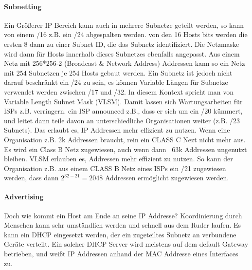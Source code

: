             \paragraph{Subnetting}
                Ein Größerer IP Bereich kann auch in mehrere Subnetze geteilt werden, so kann von einem /16 z.B. ein /24 abgespalten werden. von den 16 Hosts bits werden die ersten 8 dann zu einer Subnet ID, die das Subnetz identifiziert. Die Netzmaske wird dann für Hosts innerhalb dieses Subnetzes ebenfalls angepasst. Aus einem Netz mit 256*256-2 (Broadcast \& Network Address) Addressen kann so ein Netz mit 254 Subnetzen je 254 Hosts gebaut werden. Ein Subnetz ist jedoch nicht darauf beschränkt ein /24 zu sein, es können Variable Längen für Subnetze verwendet werden zwischen /17 und /32. In diesem Kontext spricht man von Variable Length Subnet Mask (VLSM). Damit lassen sich Wartungsarbeiten für ISPs z.B. verringern. ein ISP announced z.B., dass er sich um ein /20 kümmert, und leitet dann teile davon an unterschiedliche Organisationen weiter (z.B. /23 Subnets). Das erlaubt es, IP Addressen mehr effizient zu nutzen. Wenn eine Organisation z.B. 2k Addressen braucht, rein ein CLASS C Nezt nicht mehr aus. Es wird ein Class B Netz zugewiesen, auch wenn dann ~63k Addressen ungenutzt bleiben. VLSM erlauben es, Addressen mehr effizient zu nutzen. So kann der Organisation z.B. aus einem CLASS B Netz eines ISPs ein /21 zugewiesen werden, dass dann $2^{32-21} = 2048$ Addressen ermöglicht zugewiesen werden. 
            \paragraph{Advertising}
                Doch wie kommt ein Host am Ende an seine IP Addresse? Koordinierung durch Menschen kann sehr umständlich werden und schnell aus dem Ruder laufen. Es kann ein DHCP eingesetzt werden, der ein zugeteiltes Subnetz an verbundene Geräte verteilt. Ein solcher DHCP Server wird meistens auf dem default Gateway betrieben, und weißt IP Addressen anhand der MAC Addresse eines Interfaces zu. 

